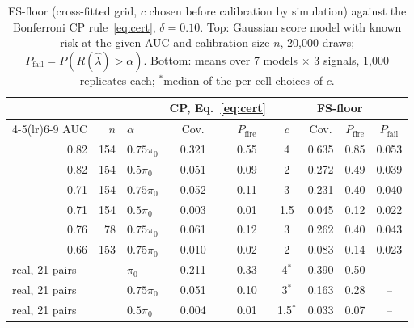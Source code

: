\begin{table}[t]
\centering\scriptsize
\caption{FS-floor (cross-fitted grid, $c$ chosen before calibration by simulation) against the Bonferroni CP rule~\eqref{eq:cert}, $\delta=0.10$. Top: Gaussian score model with known risk at the given AUC and calibration size $n$, 20{,}000 draws; $P_{\mathrm{fail}}=P(R(\hat\lambda)>\alpha)$. Bottom: means over 7 models $\times$ 3 signals, 1{,}000 replicates each; $^{\ast}$median of the per-cell choices of $c$.}
\label{tab:fs}
\setlength{\tabcolsep}{2.8pt}
\begin{tabular}{rrl cc cccc}
\toprule
 & & & \multicolumn{2}{c}{CP, Eq.~\eqref{eq:cert}} & \multicolumn{4}{c}{FS-floor} \\
\cmidrule(lr){4-5}\cmidrule(lr){6-9}
AUC & $n$ & $\alpha$ & Cov. & $P_{\mathrm{fire}}$ & $c$ & Cov. & $P_{\mathrm{fire}}$ & $P_{\mathrm{fail}}$ \\
\midrule
0.82 & 154 & $0.75\pi_0$ & 0.321 & 0.55 & 4 & 0.635 & 0.85 & 0.053 \\
0.82 & 154 & $0.5\pi_0$ & 0.051 & 0.09 & 2 & 0.272 & 0.49 & 0.039 \\
0.71 & 154 & $0.75\pi_0$ & 0.052 & 0.11 & 3 & 0.231 & 0.40 & 0.040 \\
0.71 & 154 & $0.5\pi_0$ & 0.003 & 0.01 & 1.5 & 0.045 & 0.12 & 0.022 \\
0.76 & 78 & $0.75\pi_0$ & 0.061 & 0.12 & 3 & 0.262 & 0.40 & 0.043 \\
0.66 & 153 & $0.75\pi_0$ & 0.010 & 0.02 & 2 & 0.083 & 0.14 & 0.023 \\
\midrule
\multicolumn{2}{l}{real, 21 pairs} & $\pi_0$ & 0.211 & 0.33 & 4$^{\ast}$ & 0.390 & 0.50 & -- \\
\multicolumn{2}{l}{real, 21 pairs} & $0.75\pi_0$ & 0.051 & 0.10 & 3$^{\ast}$ & 0.163 & 0.28 & -- \\
\multicolumn{2}{l}{real, 21 pairs} & $0.5\pi_0$ & 0.004 & 0.01 & 1.5$^{\ast}$ & 0.033 & 0.07 & -- \\
\bottomrule
\end{tabular}
\end{table}
